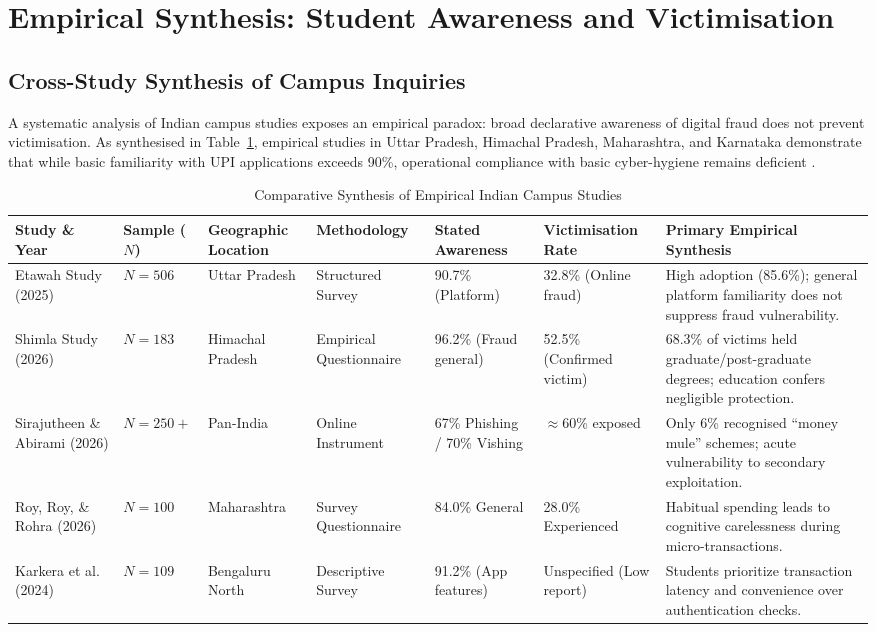 \documentclass[journal,10pt,twocolumn]{IEEEtran}
\begin{document}
\section{Empirical Synthesis: Student Awareness and Victimisation}

\subsection{Cross-Study Synthesis of Campus Inquiries}
A systematic analysis of Indian campus studies exposes an empirical paradox: broad declarative awareness of digital fraud does not prevent victimisation. As synthesised in Table~\ref{tab:literature}, empirical studies in Uttar Pradesh, Himachal Pradesh, Maharashtra, and Karnataka demonstrate that while basic familiarity with UPI applications exceeds 90\%, operational compliance with basic cyber-hygiene remains deficient \cite{exploratio2026, karkera2024, mukhopadhyay2024, roy2026}.

\begin{table}[t]
\caption{Comparative Synthesis of Empirical Indian Campus Studies}
\label{tab:literature}
\centering
\begin{tabularx}{\textwidth}{llllllX}
\toprule
\textbf{Study \& Year} & \textbf{Sample ($N$)} & \textbf{Geographic Location} & \textbf{Methodology} & \textbf{Stated Awareness} & \textbf{Victimisation Rate} & \textbf{Primary Empirical Synthesis} \\
\midrule
Etawah Study (2025) \cite{exploratio2026} & $N = 506$ & Uttar Pradesh & Structured Survey & 90.7\% (Platform) & 32.8\% (Online fraud) & High adoption (85.6\%); general platform familiarity does not suppress fraud vulnerability. \\
Shimla Study (2026) \cite{exploratio2026} & $N = 183$ & Himachal Pradesh & Empirical Questionnaire & 96.2\% (Fraud general) & 52.5\% (Confirmed victim) & 68.3\% of victims held graduate/post-graduate degrees; education confers negligible protection. \\
Sirajutheen \& Abirami (2026) \cite{mukhopadhyay2024} & $N = 250+$ & Pan-India & Online Instrument & 67\% Phishing / 70\% Vishing & $\approx$60\% exposed & Only 6\% recognised ``money mule'' schemes; acute vulnerability to secondary exploitation. \\
Roy, Roy, \& Rohra (2026) \cite{roy2026} & $N = 100$ & Maharashtra & Survey Questionnaire & 84.0\% General & 28.0\% Experienced & Habitual spending leads to cognitive carelessness during micro-transactions. \\
Karkera et al. (2024) \cite{karkera2024} & $N = 109$ & Bengaluru North & Descriptive Survey & 91.2\% (App features) & Unspecified (Low report) & Students prioritize transaction latency and convenience over authentication checks. \\
\bottomrule
\end{tabularx}
\end{table}
\end{document}
